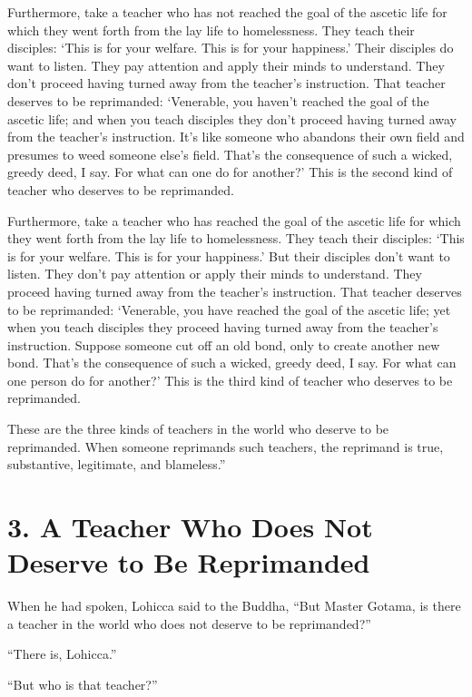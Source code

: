 \documentclass[12pt,openany]{book}%
\begin{document}
Furthermore, take a teacher who has not reached the goal of the ascetic life for which they went forth from the lay life to homelessness. They teach their disciples: ‘This is for your welfare. This is for your happiness.’ Their disciples do want to listen. They pay attention and apply their minds to understand. They don’t proceed having turned away from the teacher’s instruction. That teacher deserves to be reprimanded: ‘Venerable, you haven’t reached the goal of the ascetic life; and when you teach disciples they don’t proceed having turned away from the teacher’s instruction. It’s like someone who abandons their own field and presumes to weed someone else’s field. That’s the consequence of such a wicked, greedy deed, I say. For what can one do for another?’ This is the second kind of teacher who deserves to be reprimanded. 

Furthermore, take a teacher who has reached the goal of the ascetic life for which they went forth from the lay life to homelessness. They teach their disciples: ‘This is for your welfare. This is for your happiness.’ But their disciples don’t want to listen. They don’t pay attention or apply their minds to understand. They proceed having turned away from the teacher’s instruction. That teacher deserves to be reprimanded: ‘Venerable, you have reached the goal of the ascetic life; yet when you teach disciples they proceed having turned away from the teacher’s instruction. Suppose someone cut off an old bond, only to create another new bond. That’s the consequence of such a wicked, greedy deed, I say. For what can one person do for another?’ This is the third kind of teacher who deserves to be reprimanded. 

These are the three kinds of teachers in the world who deserve to be reprimanded. When someone reprimands such teachers, the reprimand is true, substantive, legitimate, and blameless.” 

\section*{3. A Teacher Who Does Not Deserve to Be Reprimanded }

When he had spoken, Lohicca said to the Buddha, “But Master Gotama, is there a teacher in the world who does not deserve to be reprimanded?” 

“There is, Lohicca.” 

“But who is that teacher?” 
\end{document}
